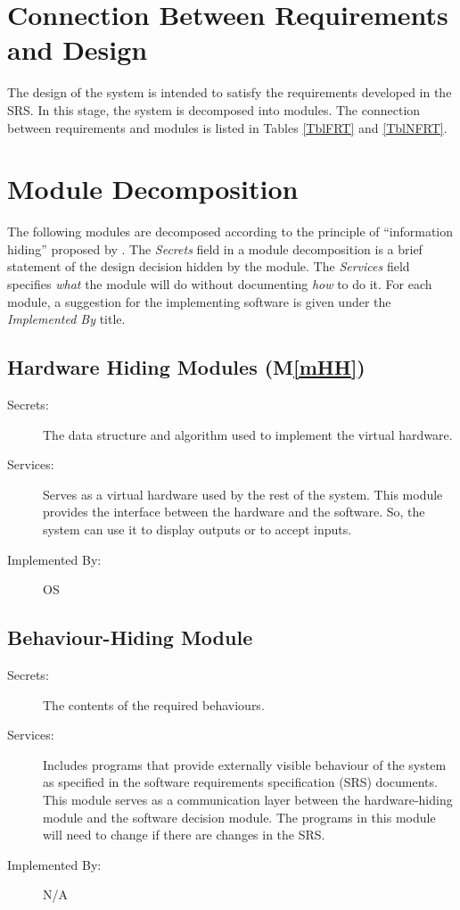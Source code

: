 \documentclass[12pt, titlepage]{article}
\newcommand{\mref}[1]{M\ref{#1}}
\begin{document}
\section{Connection Between Requirements and Design} \label{SecConnection}

The design of the system is intended to satisfy the requirements developed in
the SRS. In this stage, the system is decomposed into modules. The connection
between requirements and modules is listed in Tables \ref{TblFRT} and \ref{TblNFRT}.

\newpage

\section{Module Decomposition} \label{SecMD}

The following modules are decomposed according to the principle of ``information hiding''
proposed by \citet{ParnasEtAl1984}. The \emph{Secrets} field in a module
decomposition is a brief statement of the design decision hidden by the
module. The \emph{Services} field specifies \emph{what} the module will do
without documenting \emph{how} to do it. For each module, a suggestion for the
implementing software is given under the \emph{Implemented By} title. 

\subsection{Hardware Hiding Modules (\mref{mHH})}

\begin{description}
\item[Secrets:]The data structure and algorithm used to implement the virtual
  hardware.
\item[Services:]Serves as a virtual hardware used by the rest of the
  system. This module provides the interface between the hardware and the
  software. So, the system can use it to display outputs or to accept inputs.
\item[Implemented By:] OS
\end{description}

\subsection{Behaviour-Hiding Module}

\begin{description}
\item[Secrets:]The contents of the required behaviours.
\item[Services:]Includes programs that provide externally visible behaviour of
  the system as specified in the software requirements specification (SRS)
  documents. This module serves as a communication layer between the
  hardware-hiding module and the software decision module. The programs in this
  module will need to change if there are changes in the SRS.
\item[Implemented By:] N/A
\end{description}
\end{document}
